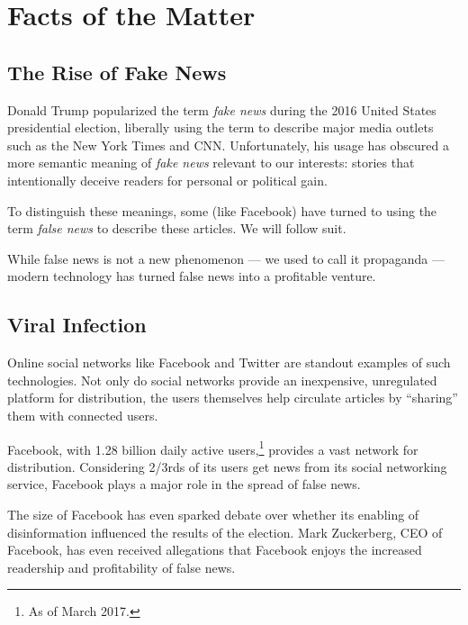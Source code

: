 
\section{Facts of the Matter}

\subsection{The Rise of Fake News}
\label{facts_rise}

\par Donald Trump popularized the term \emph{fake news} during the 2016 United States presidential election, liberally using the term to describe major media outlets such as the New York Times and CNN. \cite{telegraph_fn} Unfortunately, his usage has obscured a more semantic meaning of \emph{fake news} relevant to our interests: stories that intentionally deceive readers for personal or political gain. \cite{npr_fn}

\par To distinguish these meanings, some (like Facebook) have turned to using the term \emph{false news} to describe these articles. \cite{guardian_tips} We will follow suit.

\par While false news is not a new phenomenon --- we used to call it propaganda --- modern technology has turned false news into a profitable venture. \cite{bbc_propaganda}

\subsection{Viral Infection}

\par Online social networks like Facebook and Twitter are standout examples of such technologies. Not only do social networks provide an inexpensive, unregulated platform for distribution, \cite{telegraph_fn} the users themselves help circulate articles by ``sharing'' them with connected users. \cite{telegraph_fn} 

\par Facebook, with 1.28 billion daily active users,\footnote{As of March 2017.} \cite{fb_newsroom} provides a vast network for distribution. Considering 2/3rds of its users get news from its social networking service, \cite{pew_news} Facebook plays a major role in the spread of false news.

\par The size of Facebook has even sparked debate over whether its enabling of disinformation influenced the results of the election. \cite{wp_russia,guardian_steps,tc_snowden} Mark Zuckerberg, CEO of Facebook, has even received allegations that Facebook enjoys the increased readership and profitability of false news. \cite{tc_responsibility}

